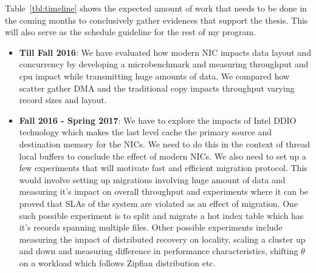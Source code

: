 
Table~\ref{tbl:timeline} shows the expected amount of work that needs to be done 
in the coming months to conclusively gather evidences that support the thesis. 
This will also serve as the schedule guideline for the rest of my program.


\begin{itemize}
\item{\textbf{Till Fall 2016}:} We have evaluated how modern NIC impacts data layout 
and concurrency by developing a microbenchmark and measuring throughput and cpu 
impact while transmitting huge amounts of data. We compared how scatter gather DMA 
and the traditional copy impacts throughput varying record sizes and layout. 

\item{\textbf{Fall 2016 - Spring 2017}:} We have to explore the impacts of Intel\textregistered 
DDIO~\cite{ddio} technology which makes the last level cache the primary source and 
destination memory for the NICs. We need to do this in the context of thread local 
buffers to conclude the effect of modern NICs. We also need to set up a few experiments
that will motivate fast and efficient migration protocol. This would involve 
setting up migrations involving huge amount of data and measuring it's impact on overall throughput
and experiments where it can be proved that SLAs of the system are violated as an effect of migration.
One such possible experiment is to split and migrate a hot index table which has it's 
records spanning multiple files. Other possible experiments include measuring the 
impact of distributed recovery on locality, scaling a cluster up and down and measuring
difference in performance characteristics, shifting $\theta$ on a workload which follows 
Zipfian distribution etc.
\end{itemize}


%
